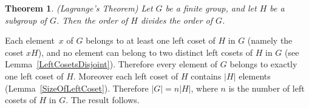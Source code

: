 \documentclass[a4paper]{article}
\newtheorem{theorem}{Theorem}[section]
\newenvironment{proof}[1][Proof]{\begin{trivlist}
\item[\hskip \labelsep {\bfseries #1}]}{\end{trivlist}}
\newcommand{\qed}{\nobreak \ifvmode \relax \else
      \ifdim\lastskip<1.5em \hskip-\lastskip
      \hskip1.5em plus0em minus0.5em \fi \nobreak
      \vrule height0.75em width0.5em depth0.25em\fi}
\begin{document}
\begin{theorem}
\emph{(Lagrange's Theorem)}
\label{Lagrange}
Let $G$ be a finite group, and let $H$ be a subgroup of $G$.  Then the order of $H$ divides the order of $G$.
\end{theorem}

\begin{proof}
Each element~$x$ of $G$ belongs to at least one left coset of $H$ in $G$ (namely the coset $xH$), and no element can belong to two distinct left cosets of $H$ in $G$ (see Lemma~\ref{LeftCosetsDisjoint}).  Therefore every element of $G$ belongs to exactly one left coset of $H$. Moreover each left coset of $H$ contains $|H|$ elements (Lemma~\ref{SizeOfLeftCoset}).  Therefore $|G| = n |H|$, where $n$ is the number of left cosets of $H$ in $G$. The result follows.\qed
\end{proof}
\end{document}
